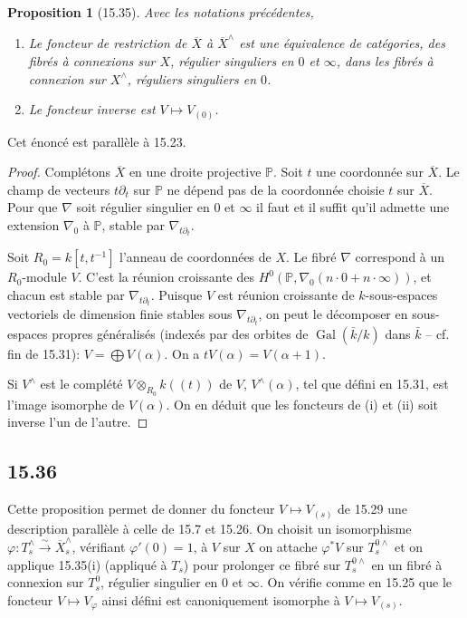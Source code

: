 \documentclass[12pt,a4paper]{article}
\theoremstyle{plain}
\newtheorem{proposition}[theorem]{Proposition}
\theoremstyle{definition}
\theoremstyle{remark}
\DeclareMathOperator{\Gal}{Gal}
\newcommand{\bP}{\mathbb{P}}
\begin{document}
\begin{proposition}[15.35]
Avec les notations précédentes,
\begin{enumerate}[label=(\roman*), nosep]
\item Le foncteur de restriction de $\overline{X}$ à $\overline{X}^\wedge$ est une équivalence de catégories, des fibrés à connexions sur $X$, régulier singuliers en $0$ et $\infty$, dans les fibrés à connexion sur $X^\wedge$, réguliers singuliers en $0$.
\item Le foncteur inverse est $V \mapsto V_{(0)}$.
\end{enumerate}
\end{proposition}

Cet énoncé est parallèle à 15.23.

\begin{proof}
Complétons $\overline{X}$ en une droite projective $\bP$. Soit $t$ une coordonnée sur $\overline{X}$. Le champ de vecteurs $t\partial_t$ sur $\bP$ ne dépend pas de la coordonnée choisie $t$ sur $\overline{X}$. Pour que $\nabla$ soit régulier singulier en $0$ et $\infty$ il faut et il suffit qu'il admette une extension $\nabla_0$ à $\bP$, stable par $\nabla_{t\partial_t}$.

Soit $R_0 = k[t, t^{-1}]$ l'anneau de coordonnées de $X$. Le fibré $\nabla$ correspond à un $R_0$-module $V$. C'est la réunion croissante des $H^0(\bP, \nabla_0(n \cdot 0 + n \cdot \infty))$, et chacun est stable par $\nabla_{t\partial_t}$. Puisque $V$ est réunion croissante de $k$-sous-espaces vectoriels de dimension finie stables sous $\nabla_{t\partial_t}$, on peut le décomposer en sous-espaces propres généralisés (indexés par des orbites de $\Gal(\bar{k}/k)$ dans $\bar{k}$ -- cf. fin de 15.31): $V = \bigoplus V(\alpha)$. On a $tV(\alpha) = V(\alpha + 1)$.

Si $V^\wedge$ est le complété $V \otimes_{R_0} k((t))$ de $V$, $V^\wedge(\alpha)$, tel que défini en 15.31, est l'image isomorphe de $V(\alpha)$. On en déduit que les foncteurs de (i) et (ii) soit inverse l'un de l'autre.
\end{proof}

\subsection*{15.36}

Cette proposition permet de donner du foncteur $V \mapsto V_{(s)}$ de 15.29 une description parallèle à celle de 15.7 et 15.26. On choisit un isomorphisme $\varphi: T_s^\wedge \xrightarrow{\sim} \overline{X}_s^\wedge$, vérifiant $\varphi'(0) = 1$, à $V$ sur $X$ on attache $\varphi^* V$ sur $T_s^{0\wedge}$ et on applique 15.35(i) (appliqué à $T_s$) pour prolonger ce fibré sur $T_s^{0\wedge}$ en un fibré à connexion sur $T_s^0$, régulier singulier en $0$ et $\infty$. On vérifie comme en 15.25 que le foncteur $V \mapsto V_\varphi$ ainsi défini est canoniquement isomorphe à $V \mapsto V_{(s)}$.
\end{document}
